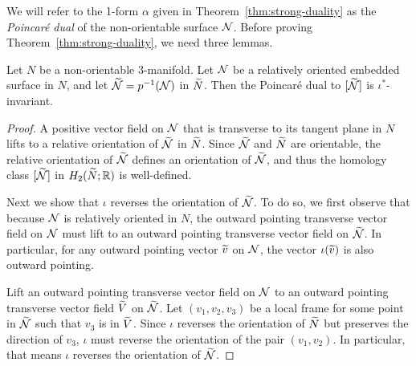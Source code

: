 We will refer to the 1-form $\alpha$ given in Theorem~\ref{thm:strong-duality} as the {\it Poincar\'e dual} of the non-orientable surface $\mathcal{N}$.  Before proving Theorem~\ref{thm:strong-duality}, we need three lemmas.

\begin{lem}
  \label{lem:PD1}
  Let $N$ be a non-orientable 3-manifold.
  Let $\mathcal{N}$ be a relatively oriented embedded surface in $N$, and let $\widetilde{\mathcal{N}}=p^{-1}(\mathcal{N})$ in $\widetilde{N}$.
  Then the Poincar\'e dual to $[\widetilde{\mathcal{N}}]$ is $\iota^{\ast}$-invariant.%
\end{lem}
\begin{proof}
  A positive vector field on $\mathcal{N}$ that is transverse to its tangent plane in $N$ lifts to a relative orientation of $\widetilde{\mathcal{N}}$ in $\widetilde{N}$.
  Since $\widetilde{\mathcal{N}}$ and $\widetilde{N}$ are orientable, the relative orientation of $\widetilde{\mathcal{N}}$ defines an orientation of $\widetilde{\mathcal{N}}$, and thus the homology class $[\widetilde{\mathcal{N}}]$ in $H_2(\widetilde{N};\mathbb{R})$ is well-defined.

  Next we show that $\iota$ reverses the orientation of $\widetilde{\mathcal{N}}$.  To do so, we first observe that because $\mathcal{N}$ is relatively oriented in $N$, the outward pointing transverse vector field on ${\mathcal{N}}$ must lift to an outward pointing transverse vector field on $\widetilde{\mathcal{N}}$.  In particular, for any outward pointing vector $\widetilde{v}$ on $\mathcal{N}$, the vector $\iota(\widetilde{v})$ is also outward pointing.

  Lift an outward pointing transverse vector field on $\mathcal{N}$ to an outward pointing transverse vector field $\widetilde{V}$ on $\widetilde{\mathcal{N}}$.  Let $(v_1, v_2, v_3)$ be a local frame for some point in $\widetilde{\mathcal{N}}$ such that
  $v_3$ is in $\widetilde{V}$.
  Since $\iota$ reverses the orientation of $\widetilde{N}$ but preserves the direction of $v_3$, $\iota$ must reverse the orientation of the pair $(v_1, v_2)$.
  In particular, that means $\iota$ reverses the orientation of $\widetilde{\mathcal{N}}$.


\end{proof}
